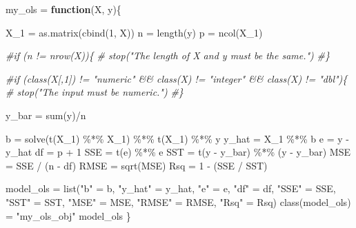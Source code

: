 \documentclass[
]{article}
\newenvironment{Shaded}{\begin{snugshade}}{\end{snugshade}}
\newcommand{\CommentTok}[1]{\textcolor[rgb]{0.56,0.35,0.01}{\textit{#1}}}
\newcommand{\ControlFlowTok}[1]{\textcolor[rgb]{0.13,0.29,0.53}{\textbf{#1}}}
\newcommand{\DecValTok}[1]{\textcolor[rgb]{0.00,0.00,0.81}{#1}}
\newcommand{\FunctionTok}[1]{\textcolor[rgb]{0.00,0.00,0.00}{#1}}
\newcommand{\NormalTok}[1]{#1}
\newcommand{\OtherTok}[1]{\textcolor[rgb]{0.56,0.35,0.01}{#1}}
\newcommand{\SpecialCharTok}[1]{\textcolor[rgb]{0.00,0.00,0.00}{#1}}
\newcommand{\StringTok}[1]{\textcolor[rgb]{0.31,0.60,0.02}{#1}}
\begin{document}
\begin{Shaded}
\begin{Highlighting}[]
\NormalTok{my\_ols }\OtherTok{=} \ControlFlowTok{function}\NormalTok{(X, y)\{}
  
\NormalTok{  X\_1 }\OtherTok{=} \FunctionTok{as.matrix}\NormalTok{(}\FunctionTok{cbind}\NormalTok{(}\DecValTok{1}\NormalTok{, X))}
\NormalTok{  n }\OtherTok{=} \FunctionTok{length}\NormalTok{(y)}
\NormalTok{  p }\OtherTok{=} \FunctionTok{ncol}\NormalTok{(X\_1)}
  
  \CommentTok{\#if (n != nrow(X))\{}
   \CommentTok{\# stop("The length of X and y must be the same.")}
  \CommentTok{\#\}}
  
  \CommentTok{\#if (class(X[,1]) != "numeric" \&\& class(X) != "integer" \&\& class(X) != "dbl")\{}
   \CommentTok{\# stop("The input must be numeric.")}
  \CommentTok{\#\}}
  
\NormalTok{  y\_bar }\OtherTok{=} \FunctionTok{sum}\NormalTok{(y)}\SpecialCharTok{/}\NormalTok{n}
  
\NormalTok{  b }\OtherTok{=} \FunctionTok{solve}\NormalTok{(}\FunctionTok{t}\NormalTok{(X\_1) }\SpecialCharTok{\%*\%}\NormalTok{ X\_1) }\SpecialCharTok{\%*\%} \FunctionTok{t}\NormalTok{(X\_1) }\SpecialCharTok{\%*\%}\NormalTok{ y }
\NormalTok{  y\_hat }\OtherTok{=}\NormalTok{ X\_1 }\SpecialCharTok{\%*\%}\NormalTok{ b}
\NormalTok{  e }\OtherTok{=}\NormalTok{ y }\SpecialCharTok{{-}}\NormalTok{ y\_hat}
\NormalTok{  df }\OtherTok{=}\NormalTok{ p }\SpecialCharTok{+} \DecValTok{1}
\NormalTok{  SSE }\OtherTok{=} \FunctionTok{t}\NormalTok{(e) }\SpecialCharTok{\%*\%}\NormalTok{ e}
\NormalTok{  SST }\OtherTok{=} \FunctionTok{t}\NormalTok{(y }\SpecialCharTok{{-}}\NormalTok{ y\_bar) }\SpecialCharTok{\%*\%}\NormalTok{ (y }\SpecialCharTok{{-}}\NormalTok{ y\_bar)}
\NormalTok{  MSE }\OtherTok{=}\NormalTok{ SSE }\SpecialCharTok{/}\NormalTok{ (n }\SpecialCharTok{{-}}\NormalTok{ df)}
\NormalTok{  RMSE }\OtherTok{=} \FunctionTok{sqrt}\NormalTok{(MSE)}
\NormalTok{  Rsq }\OtherTok{=} \DecValTok{1} \SpecialCharTok{{-}}\NormalTok{ (SSE }\SpecialCharTok{/}\NormalTok{ SST)}
    
\NormalTok{  model\_ols }\OtherTok{=} \FunctionTok{list}\NormalTok{(}\StringTok{"b"} \OtherTok{=}\NormalTok{ b, }\StringTok{"y\_hat"} \OtherTok{=}\NormalTok{ y\_hat, }\StringTok{"e"} \OtherTok{=}\NormalTok{ e, }\StringTok{"df"} \OtherTok{=}\NormalTok{ df, }\StringTok{"SSE"} \OtherTok{=}\NormalTok{ SSE, }\StringTok{"SST"} \OtherTok{=}\NormalTok{ SST, }\StringTok{"MSE"} \OtherTok{=}\NormalTok{ MSE, }\StringTok{"RMSE"} \OtherTok{=}\NormalTok{ RMSE, }\StringTok{"Rsq"} \OtherTok{=}\NormalTok{ Rsq)}
  \FunctionTok{class}\NormalTok{(model\_ols) }\OtherTok{=} \StringTok{"my\_ols\_obj"}
\NormalTok{  model\_ols}
\NormalTok{\}}
\end{Highlighting}
\end{Shaded}
\end{document}

